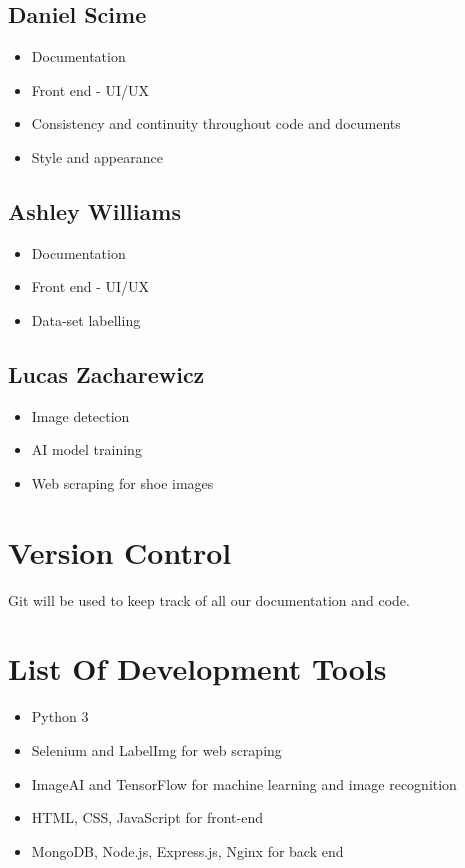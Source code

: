 \documentclass[12pt, titlepage]{article}
\begin{document}
\subsection{Daniel Scime}
\begin{itemize}
    \item Documentation
    \item Front end - UI/UX
    \item Consistency and continuity throughout code and documents
    \item Style and appearance
\end{itemize}
\subsection{Ashley Williams}
\begin{itemize}
    \item Documentation
    \item Front end - UI/UX
    \item Data-set labelling
\end{itemize}
\subsection{Lucas Zacharewicz}
\begin{itemize}
    \item Image detection
    \item AI model training 
    \item Web scraping for shoe images
\end{itemize}

\section{Version Control}
Git will be used to keep track of all our documentation and code. 

\section{List Of Development Tools}
\begin{itemize}
\item Python 3
\item Selenium and LabelImg for web scraping
\item ImageAI and TensorFlow for machine learning and image recognition
\item HTML, CSS, JavaScript for front-end
\item MongoDB, Node.js, Express.js, Nginx for back end
\end{itemize}
\end{document}
